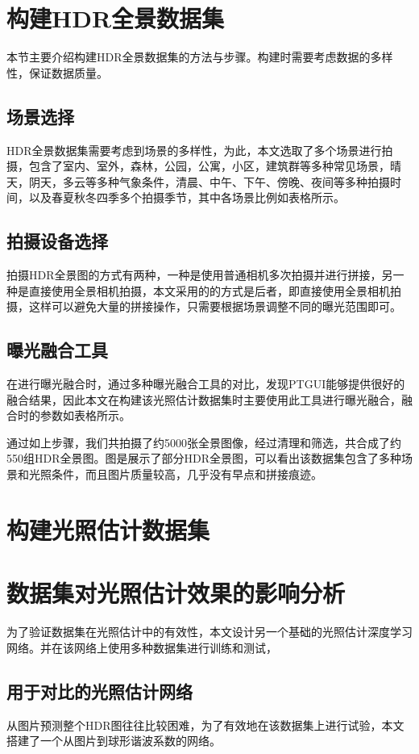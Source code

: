 \section{构建HDR全景数据集}
本节主要介绍构建HDR全景数据集的方法与步骤。构建时需要考虑数据的多样性，保证数据质量。
\subsection{场景选择}
HDR全景数据集需要考虑到场景的多样性，为此，本文选取了多个场景进行拍摄，包含了室内、室外，森林，公园，公寓，小区，建筑群等多种常见场景，晴天，阴天，多云等多种气象条件，清晨、中午、下午、傍晚、夜间等多种拍摄时间，以及春夏秋冬四季多个拍摄季节，其中各场景比例如表格所示。
\subsection{拍摄设备选择}
拍摄HDR全景图的方式有两种，一种是使用普通相机多次拍摄并进行拼接，另一种是直接使用全景相机拍摄，本文采用的的方式是后者，即直接使用全景相机拍摄，这样可以避免大量的拼接操作，只需要根据场景调整不同的曝光范围即可。
\subsection{曝光融合工具}
在进行曝光融合时，通过多种曝光融合工具的对比，发现PTGUI\cite{ptgui}能够提供很好的融合结果，因此本文在构建该光照估计数据集时主要使用此工具进行曝光融合，融合时的参数如表格所示。

通过如上步骤，我们共拍摄了约5000张全景图像，经过清理和筛选，共合成了约550组HDR全景图。图是展示了部分HDR全景图，可以看出该数据集包含了多种场景和光照条件，而且图片质量较高，几乎没有早点和拼接痕迹。
\section{构建光照估计数据集}
\section{数据集对光照估计效果的影响分析}
为了验证数据集在光照估计中的有效性，本文设计另一个基础的光照估计深度学习网络。并在该网络上使用多种数据集进行训练和测试，
\subsection{用于对比的光照估计网络}
从图片预测整个HDR图往往比较困难，为了有效地在该数据集上进行试验，本文搭建了一个从图片到球形谐波系数的网络。
